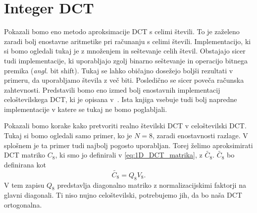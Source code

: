 \documentclass[a4paper,12pt,openright]{book}
\begin{document}
\section{Integer DCT}
Pokazali bomo eno metodo aproksimacije DCT s celimi števili. To je zaželeno zaradi bolj enostavne aritmetike pri računanju s celimi števili. Implementacijo, ki si bomo ogledali tukaj je z množenjem in seštevanje celih števil. Obstajajo sicer tudi implementacije, ki uporabljajo zgolj binarno seštevanje in operacijo bitnega premika (\textit{angl.} bit shift). Tukaj se lahko običajno dosežejo boljši rezultati v primeru, da uporabljamo števila z več biti. Posledično se sicer poveča računska zahtevnosti. Predstavili bomo eno izmed bolj enostavnih implementacij celo\-šte\-vil\-ske\-ga DCT, ki je opisana v~\cite{britanak2010discrete}. Ista knjiga vsebuje tudi bolj napredne implementacije v katere se tukaj ne bomo poglabljali.\par
Pokazali bomo korake kako pretvoriti realno številski DCT v celoštevilski DCT. Tukaj si bomo ogledali samo primer, ko je $N=8$, zaradi enostavnosti razlage. V splošnem je ta primer tudi najbolj pogosto uporabljan. Torej želimo aproksimirati DCT matriko $C_8$, ki smo jo definirali v \eqref{eq:1D_DCT_matrika}, z $\widetilde{C_8}$. $\widetilde{C_8}$ bo definirana kot
\begin{equation}
  \widetilde{C_8} = Q_8 V_8.
\label{eq:c_8}
\end{equation}
V tem zapisu $Q_8$ predstavlja diagonalno matriko z normalizacijskimi faktorji na glavni diagonali. Ti niso nujno celoštevilski, potrebujemo jih, da bo naša DCT ortogonalna. 
\end{document}
